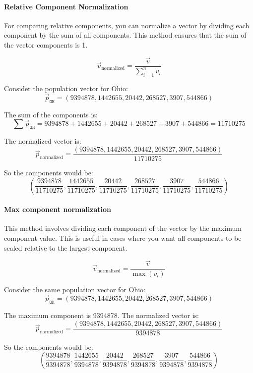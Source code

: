 \documentclass{ximera}
\begin{document}
\paragraph{Relative Component Normalization}

For comparing relative components, you can normalize a vector by
dividing each component by the sum of all components. This method
ensures that the sum of the vector components is 1.

\[ \vec{v}_{\text{normalized}} = \frac{\vec{v}}{\sum_{i=1}^n v_i} \]

\begin{example}
Consider the population vector for Ohio:
\[ \vec{p}_{\texttt{OH}} = (9394878, 1442655, 20442, 268527, 3907, 544866) \]

The sum of the components is:
\[ \sum \vec{p}_{\texttt{OH}} = 9394878 + 1442655 + 20442 + 268527 + 3907 + 544866 = 11710275 \]

The normalized vector is:
\[ \vec{p}_{\text{normalized}} = \frac{(9394878, 1442655, 20442, 268527, 3907, 544866)}{11710275} \]

So the components would be:
\[ \left(\frac{9394878}{11710275}, \frac{1442655}{11710275}, \frac{20442}{11710275}, \frac{268527}{11710275}, \frac{3907}{11710275}, \frac{544866}{11710275}\right) \]
\end{example}






\paragraph{Max component normalization}

This method involves dividing each component of the vector by the maximum component value. This is useful in cases where you want all components to be scaled relative to the largest component.

\[ \vec{v}_{\text{normalized}} = \frac{\vec{v}}{\max(v_i)} \]

\begin{example}
Consider the same population vector for Ohio:
\[ \vec{p}_{\texttt{OH}} = (9394878, 1442655, 20442, 268527, 3907, 544866) \]

The maximum component is 9394878. The normalized vector is:
\[ \vec{p}_{\text{normalized}} = \frac{(9394878, 1442655, 20442, 268527, 3907, 544866)}{9394878} \]

So the components would be:
\[ \left(\frac{9394878}{9394878}, \frac{1442655}{9394878}, \frac{20442}{9394878}, \frac{268527}{9394878}, \frac{3907}{9394878}, \frac{544866}{9394878}\right) \]
\end{example}
\end{document}
